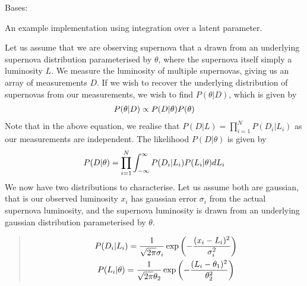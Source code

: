 \documentclass[letterpaper,10pt,english]{sphinxmanual}
\begin{document}
\begin{fulllineitems}
\label{dessn.simple:dessn.simple.exampleIntegral.ExampleIntegral}
Bases: 

An example implementation using integration over a latent parameter.

Let us assume that we are observing supernova that a drawn from an underlying
supernova distribution parameterised by \(\theta\),
where the supernova itself simply a luminosity \(L\). We measure the luminosity
of multiple supernovas, giving us an array of measurements \(D\). If we wish to recover
the underlying distribution of supernovas from our measurements, we wish to find \(P(\theta|D)\),
which is given by
\begin{gather}
\begin{split}P(\theta|D) \propto P(D|\theta)P(\theta)\end{split}\notag
\end{gather}
Note that in the above equation, we realise that \(P(D|L) = \prod_{i=1}^N P(D_i|L_i)\) as our measurements are
independent. The likelihood \(P(D|\theta)\) is given by
\begin{gather}
\begin{split}P(D|\theta) =  \prod_{i=1}^N  \int_{-\infty}^\infty P(D_i|L_i) P(L_i|\theta) dL_i\end{split}\notag
\end{gather}
We now have two distributions to characterise. Let us assume both are gaussian, that is
our observed luminosity \(x_i\) has gaussian error \(\sigma_i\) from the actual supernova
luminosity, and the supernova luminosity is drawn from an underlying gaussian distribution
parameterised by \(\theta\).
\begin{quote}
\begin{gather}
\begin{split}P(D_i|L_i) = \frac{1}{\sqrt{2\pi}\sigma_i}\exp\left(-\frac{(x_i-L_i)^2}{\sigma_i^2}\right)\end{split}\notag\\\begin{split}P(L_i|\theta) = \frac{1}{\sqrt{2\pi}\theta_2}\exp\left(-\frac{(L_i-\theta_1)^2}{\theta_2^2}\right)\end{split}\notag
\end{gather}\end{quote}


\end{fulllineitems}
\end{document}
